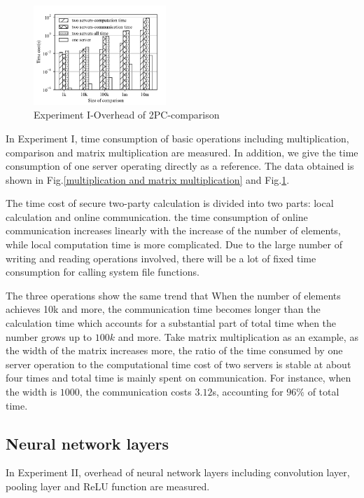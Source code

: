 \documentclass[letterpaper]{article} %
\begin{document}
    \begin{figure}[htbp]

        \centering
        \includegraphics[width=5cm]{operation_compare.pdf}
        \caption{Experiment I-Overhead of 2PC-comparison}
        \label{operation_compare}
    \end{figure}
    In Experiment I, time consumption of basic operations including multiplication, comparison and matrix multiplication are measured.
    In addition, we give the time consumption of one server operating directly as a reference.
    The data obtained is shown in Fig.\ref{multiplication and matrix multiplication} and Fig.\ref{operation_compare}.

    The time cost of secure two-party calculation is divided into two parts:
    local calculation and online communication.
    the time consumption of online communication increases linearly with the increase of the number of elements,
    while local computation time is more complicated.
    Due to the large number of writing and reading operations involved,
    there will be a lot of fixed time consumption for calling system file functions.

    The three operations show the same trend that
    When the number of elements achieves 10k and more,
    the communication time becomes longer than the calculation time
    which accounts for a substantial part of total time when the number grows up to $100k$ and more.
    Take matrix multiplication as an example, as the width of the matrix increases more,
    the ratio of the time consumed by one server operation
    to the computational time cost of two servers is stable at about four times and total time is mainly spent on communication.
    For instance, when the width is $1000$, the communication costs $3.12$s, accounting for $96\%$ of total time.

    \subsection{Neural network layers}
    In Experiment II, overhead of neural network layers including
    convolution layer, pooling layer and ReLU function are measured.
\end{document}

